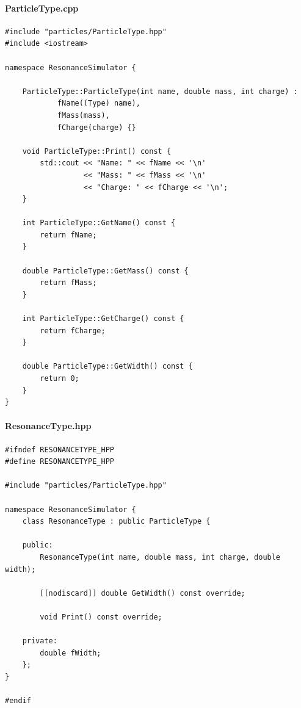\documentclass[12pt, a4paper]{article}
\begin{document}
\paragraph{ParticleType.cpp}

\begin{verbatim}
#include "particles/ParticleType.hpp"
#include <iostream>

namespace ResonanceSimulator {

    ParticleType::ParticleType(int name, double mass, int charge) :
            fName((Type) name),
            fMass(mass),
            fCharge(charge) {}

    void ParticleType::Print() const {
        std::cout << "Name: " << fName << '\n'
                  << "Mass: " << fMass << '\n'
                  << "Charge: " << fCharge << '\n';
    }

    int ParticleType::GetName() const {
        return fName;
    }

    double ParticleType::GetMass() const {
        return fMass;
    }

    int ParticleType::GetCharge() const {
        return fCharge;
    }

    double ParticleType::GetWidth() const {
        return 0;
    }
}
\end{verbatim}

\paragraph{ResonanceType.hpp}

\begin{verbatim}
#ifndef RESONANCETYPE_HPP
#define RESONANCETYPE_HPP

#include "particles/ParticleType.hpp"

namespace ResonanceSimulator {
    class ResonanceType : public ParticleType {

    public:
        ResonanceType(int name, double mass, int charge, double width);

        [[nodiscard]] double GetWidth() const override;

        void Print() const override;

    private:
        double fWidth;
    };
}

#endif
\end{verbatim}
\end{document}
